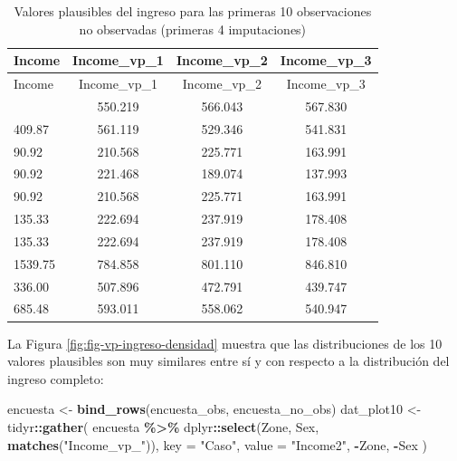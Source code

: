 \documentclass[
  spanish,
  12pt,
]{book}
\newenvironment{Shaded}{\begin{snugshade}}{\end{snugshade}}
\newcommand{\AttributeTok}[1]{\textcolor[rgb]{0.13,0.29,0.53}{#1}}
\newcommand{\FunctionTok}[1]{\textcolor[rgb]{0.13,0.29,0.53}{\textbf{#1}}}
\newcommand{\NormalTok}[1]{#1}
\newcommand{\OtherTok}[1]{\textcolor[rgb]{0.56,0.35,0.01}{#1}}
\newcommand{\SpecialCharTok}[1]{\textcolor[rgb]{0.81,0.36,0.00}{\textbf{#1}}}
\newcommand{\StringTok}[1]{\textcolor[rgb]{0.31,0.60,0.02}{#1}}
\begin{document}
\begin{longtable}[]{@{}lccc@{}}
\caption{\label{tab:tab-vp-ingreso}Valores plausibles del ingreso para las primeras 10 observaciones no observadas (primeras 4 imputaciones)}\tabularnewline
\toprule\noalign{}
Income & Income\_vp\_1 & Income\_vp\_2 & Income\_vp\_3 \\
\midrule\noalign{}
\endfirsthead
\toprule\noalign{}
Income & Income\_vp\_1 & Income\_vp\_2 & Income\_vp\_3 \\
\midrule\noalign{}
\endhead
\bottomrule\noalign{}
\endlastfoot
409.87 & 550.219 & 566.043 & 567.830 \\
409.87 & 561.119 & 529.346 & 541.831 \\
90.92 & 210.568 & 225.771 & 163.991 \\
90.92 & 221.468 & 189.074 & 137.993 \\
90.92 & 210.568 & 225.771 & 163.991 \\
135.33 & 222.694 & 237.919 & 178.408 \\
135.33 & 222.694 & 237.919 & 178.408 \\
1539.75 & 784.858 & 801.110 & 846.810 \\
336.00 & 507.896 & 472.791 & 439.747 \\
685.48 & 593.011 & 558.062 & 540.947 \\
\end{longtable}

La Figura \ref{fig:fig-vp-ingreso-densidad} muestra que las distribuciones de los 10 valores plausibles son muy similares entre sí y con respecto a la distribución del ingreso completo:

\begin{Shaded}
\begin{Highlighting}[]
\NormalTok{encuesta }\OtherTok{\textless{}{-}} \FunctionTok{bind\_rows}\NormalTok{(encuesta\_obs, encuesta\_no\_obs)}
\NormalTok{dat\_plot10 }\OtherTok{\textless{}{-}}\NormalTok{ tidyr}\SpecialCharTok{::}\FunctionTok{gather}\NormalTok{(}
\NormalTok{  encuesta }\SpecialCharTok{\%\textgreater{}\%}\NormalTok{ dplyr}\SpecialCharTok{::}\FunctionTok{select}\NormalTok{(Zone, Sex, }\FunctionTok{matches}\NormalTok{(}\StringTok{"Income\_vp\_"}\NormalTok{)),}
  \AttributeTok{key =} \StringTok{"Caso"}\NormalTok{, }\AttributeTok{value =} \StringTok{"Income2"}\NormalTok{, }\SpecialCharTok{{-}}\NormalTok{Zone, }\SpecialCharTok{{-}}\NormalTok{Sex}
\NormalTok{)}
\end{Highlighting}
\end{Shaded}
\end{document}
